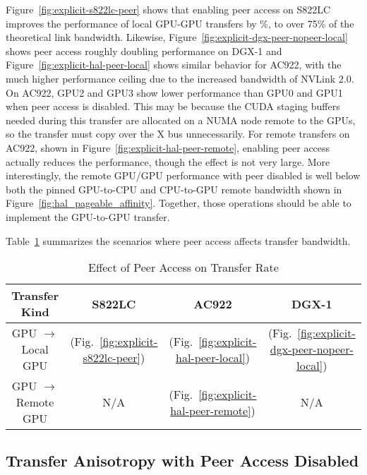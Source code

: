 Figure~\ref{fig:explicit-s822lc-peer} shows that enabling peer access on S822LC improves the performance of local GPU-GPU transfers by \%, to over 75\% of the theoretical link bandwidth.
Likewise, Figure~\ref{fig:explicit-dgx-peer-nopeer-local} shows peer access roughly doubling performance on DGX-1 and Figure~\ref{fig:explicit-hal-peer-local} shows similar behavior for AC922, with the much higher performance ceiling due to the increased bandwidth of NVLink 2.0.
On AC922, GPU2 and GPU3 show lower performance than GPU0 and GPU1 when peer access is disabled.
This may be because the CUDA staging buffers needed during this transfer are allocated on a NUMA node remote to the GPUs, so the transfer must copy over the X bus unnecessarily.
For remote transfers on AC922, shown in Figure~\ref{fig:explicit-hal-peer-remote}, enabling peer access actually reduces the performance, though the effect is not very large.
More interestingly, the remote GPU/GPU performance with peer disabled is well below both the pinned GPU-to-CPU and CPU-to-GPU remote bandwidth shown in Figure~\ref{fig:hal_pageable_affinity}.
Together, those operations should be able to implement the GPU-to-GPU transfer.

Table~\ref{tab:explicit-peer-rate} summarizes the scenarios where peer access affects transfer bandwidth.

\begin{table}[H]
	\centering
	\caption[Effect of Peer Access on Transfer Rate]{Effect of Peer Access on Transfer Rate}
	\label{tab:explicit-peer-rate}
	\begin{tabular}{cccc}
		\hline
		\textbf{Transfer Kind}       & \textbf{S822LC}                                   & \textbf{AC922}                                       & \textbf{DGX-1}                                             \\ \hline 
		GPU $\rightarrow$ Local GPU  & \checkmark  (Fig.~\ref{fig:explicit-s822lc-peer}) & \checkmark (Fig.~\ref{fig:explicit-hal-peer-local})  & \checkmark (Fig.~\ref{fig:explicit-dgx-peer-nopeer-local}) \\ \hline
		GPU $\rightarrow$ Remote GPU & N/A                                               & \checkmark (Fig.~\ref{fig:explicit-hal-peer-remote}) & N/A                                                        \\ \hline
	\end{tabular}
\end{table}


\subsection{Transfer Anisotropy with Peer Access Disabled}
\label{sec:explicit-peer-direction}

